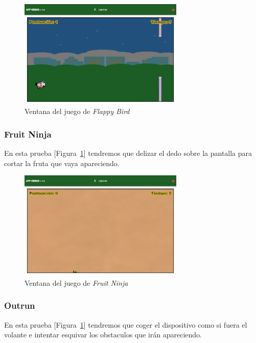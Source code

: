\begin{figure}[!h]
    \centering
    \includegraphics[width=0.7\textwidth, keepaspectratio]{imaxes/application/flappy-bird-page.png}
    \caption{Ventana del juego de \textit{Flappy Bird}}
    \label{fig:bird_page}
\end{figure}

\subsubsection{Fruit Ninja}
En esta prueba [Figura~\ref{fig:bird_page}] tendremos que delizar el dedo sobre la pantalla para cortar la fruta que vaya apareciendo.

\begin{figure}[!h]
    \centering
    \includegraphics[width=0.7\textwidth, keepaspectratio]{imaxes/application/fruit-ninja-page.png}
    \caption{Ventana del juego de \textit{Fruit Ninja}}
    \label{fig:fruit_page}
\end{figure}

\subsubsection{Outrun}
En esta prueba [Figura~\ref{fig:bird_page}] tendremos que coger el dispositivo como si fuera el volante e intentar esquivar los obstaculos que irán apareciendo.

